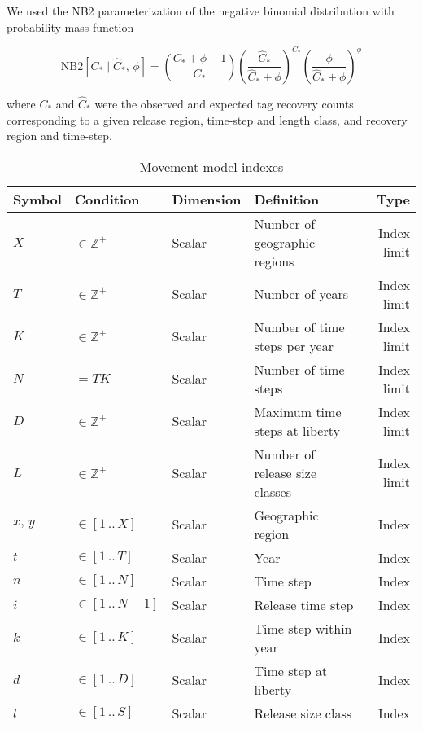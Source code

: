 \documentclass{article}
\begin{document}
We used the NB2 parameterization of the negative binomial distribution with probability mass function

\begin{equation}
  \label{eq:sampling}
  \mathrm{NB2} \! \left[ C_* \mid \widehat{C}_*,\, \phi \right] = \binom{C_* + \phi - 1}{C_*} \left(\frac{\widehat{C}_*}{\widehat{C}_* + \phi}\right)^{C_*} \left( \frac{\phi}{\widehat{C}_* + \phi} \right)^{\phi}
\end{equation}

\noindent where $C_*$ and $\widehat{C}_*$ were the observed and expected tag recovery counts corresponding to a given release region, time-step and length class, and recovery region and time-step.


\begin{table}[ht]
  \centering
  \caption{Movement model indexes}
  \renewcommand\arraystretch{1.2}
  \label{tab:model-indexes}
  \begin{tabular}{l l l l r}
    \toprule
    \textbf{Symbol} & \textbf{Condition} & \textbf{Dimension} & \textbf{Definition} & \textbf{Type} \\
    \toprule
    $X$ & $\in \mathbb{Z}^{+}$ & Scalar & Number of geographic regions & Index limit \\
    $T$ & $\in \mathbb{Z}^{+}$ & Scalar & Number of years & Index limit \\
    $K$ & $\in \mathbb{Z}^{+}$ & Scalar & Number of time steps per year & Index limit \\
    $N$ & $ = TK $ & Scalar & Number of time steps & Index limit \\
    $D$ & $\in \mathbb{Z}^{+}$ & Scalar & Maximum time steps at liberty & Index limit \\
    $L$ & $\in \mathbb{Z}^{+}$ & Scalar & Number of release size classes & Index limit \\
    \midrule
    $x, \, y$ & $\in \left[1 \, .. \, X \right]$ & Scalar & Geographic region & Index \\
    $t$ & $\in \left[1 \, .. \, T \right]$ & Scalar & Year & Index \\
    $n$ & $\in \left[1 \, .. \, N \right]$ & Scalar & Time step & Index \\
    $i$ & $\in \left[1 \, .. \, N\!-\!1 \right]$ & Scalar & Release time step & Index \\
    $k$ & $\in \left[1 \, .. \, K \right]$ & Scalar & Time step within year & Index \\
    $d$ & $\in \left[1 \, .. \, D \right]$ & Scalar & Time step at liberty & Index \\
    $l$ & $\in \left[1 \, .. \, S \right]$ & Scalar & Release size class & Index \\
    \bottomrule
  \end{tabular}
\end{table}
\end{document}
